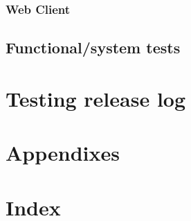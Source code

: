 \documentclass[a4paper,12pt]{article}
\begin{document}
		    \subsubsection{Web Client}
	    
	    \subsection{Functional/system tests}
	
	\section{Testing release log}
        
    \section{Appendixes}
    \section{Index}
    \pagebreak  
\end{document}
